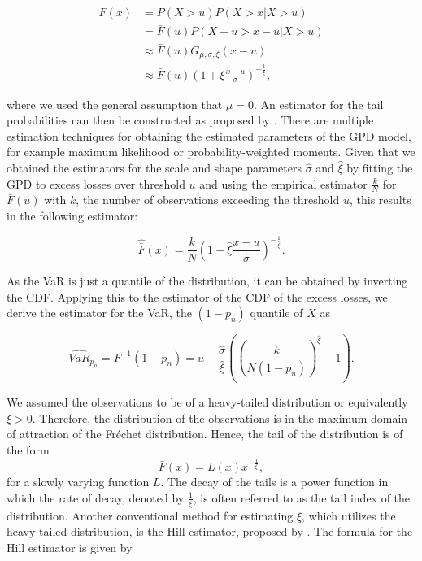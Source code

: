 \documentclass[a4paper,12pt]{article}
\theoremstyle{plain}
\begin{document}
\begin{equation}
\begin{split}
    \bar{F}(x) &= P(X>u)P(X>x|X>u)\\
    & =\bar{F}(u)P(X-u>x-u|X>u)\\
    & \approx\bar{F}(u)G_{\mu, \sigma, \xi}(x-u)\\
    & \approx\bar{F}(u)(1 + \xi\frac{x-u}{\sigma})^{-\frac{1}{\xi}},
\end{split}
\end{equation}

\noindent where we used the general assumption that $\mu=0$. An estimator for the tail probabilities can then be constructed as proposed by . There are multiple estimation techniques for obtaining the estimated parameters of the GPD model, for example maximum likelihood or probability-weighted moments. Given that we obtained the estimators for the scale and shape parameters $\hat{\sigma}$ and $\hat{\xi}$ by fitting the GPD to excess losses over threshold $u$ and using the empirical estimator $\frac{k}{N}$ for $\bar{F}(u)$ with $k$, the number of observations exceeding the threshold $u$, this results in the following estimator:

\begin{equation}
    \hat{\bar{F}}(x)=\frac{k}{N}(1 + \hat{\xi}\frac{x-u}{\hat{\sigma}})^{-\frac{1}{\hat{\xi}}}.
    \label{eq:smith}
\end{equation}

As the VaR is just a quantile of the distribution, it can be obtained by inverting the CDF. Applying this to the estimator of the CDF of the excess losses, we derive the estimator for the VaR, the $(1-p_n)$ quantile of $X$ as

\begin{equation}
    \widehat{VaR}_{p_n}=F^{-1}(1-p_n)=u + \frac{\hat{\sigma}}{\hat{\xi}}\left(\left(\frac{k}{N(1-p_n)}\right)^{\hat{\xi}} - 1\right).
    \label{eq:varpotiid}
\end{equation}

We assumed the observations to be of a heavy-tailed distribution or equivalently $\xi>0$. Therefore, the distribution of the observations is in the maximum domain of attraction of the Fr\'echet distribution. Hence, the tail of the distribution is of the form 
\begin{equation}
    \bar{F}(x)=L\left(x\right)x^{-\frac{1}{\xi}},
    \label{eq:power}
\end{equation}
for a slowly varying function $L$. The decay of the tails is a power function in which the rate of decay, denoted by $\frac{1}{\xi}$, is often referred to as the tail index of the distribution. Another conventional method for estimating $\xi$, which utilizes the heavy-tailed distribution, is the Hill estimator, proposed by . The formula for the Hill estimator is given by
\end{document}
